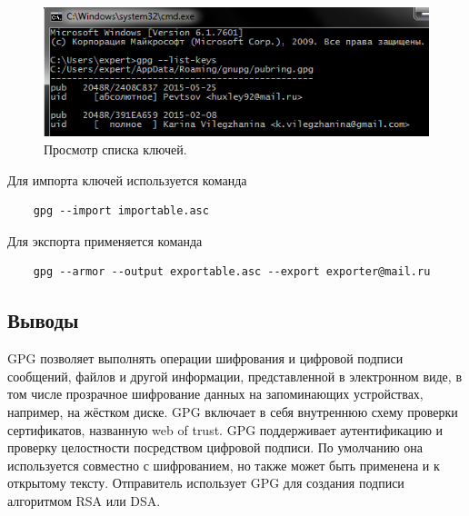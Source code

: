 \documentclass[a4paper, 14pt]{article}				%
\begin{document}
\begin{figure}[h!]
\centering
\includegraphics[width=\textwidth]{fig14}
\caption{Просмотр списка ключей.}
\end{figure}

Для импорта ключей используется команда
\begin{verbatim}
	gpg --import importable.asc
\end{verbatim}
Для экспорта применяется команда
\begin{verbatim}
	gpg --armor --output exportable.asc --export exporter@mail.ru
\end{verbatim}

\subsection{Выводы}
GPG позволяет выполнять операции шифрования и цифровой подписи сообщений, файлов и другой информации, представленной в электронном виде, в том числе прозрачное шифрование данных на запоминающих устройствах, например, на жёстком диске. GPG включает в себя внутреннюю схему проверки сертификатов, названную web of trust. GPG поддерживает аутентификацию и проверку целостности посредством цифровой подписи. По умолчанию она используется совместно с шифрованием, но также может быть применена и к открытому тексту. Отправитель использует GPG для создания подписи алгоритмом RSA или DSA.
\end{document}
